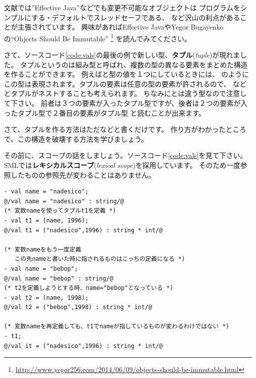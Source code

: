 \documentclass[11pt,a4paper]{article}
\begin{document}
文献では''Effective Java''などでも変更不可能なオブジェクトは
プログラムをシンプルにする・デフォルトでスレッドセーフである、
など沢山の利点があることが主張されています。
興味があればEffective JavaやYegor Bugayenkoの``Objects Should Be Immutable''
\footnote{\url{http://www.yegor256.com/2014/06/09/objects-should-be-immutable.html}}
を読んでみてください。

さて、ソースコード\ref{code:vals}の最後の例で新しい型、{\bfseries タプル}({\itshape tuple})が現れました。
タプルというのは組み型と呼ばれ、複数の型の異なる要素をまとめた構造を作ることができます。
例えばと型の値を１つにしているときには、
のようにこの型は表現されます。タプルの要素は任意の型の要素が許されるので、
などとタプルがネストすることも考えられます。
ちなみにとは違う型なので注意して下さい。
前者は３つの要素が入ったタプル型ですが、後者は２つの要素が入ったタプル型で２番目の要素がタプル型
と読むことが出来ます。

さて、タプルを作る方法はただなどと書くだけです。
作り方がわかったところで、この構造を破壊する方法を学びましょう。

その前に、スコープの話をしましょう。ソースコード\ref{code:vals}を見て下さい。
SMLでは{\bfseries レキシカルスコープ}({\itshape lexical scope})を採用しています。
そのため一度参照したものの参照先が変わることはありません。

\begin{lstlisting}[caption=valのスコープ,label=code:vals]
- val name = "nadesico";
@/val name = "nadesico" : string/@
(* 変数nameを使ってタプルt1を定義 *)
- val t1 = (name, 1996);
@/val t1 = ("nadesico",1996) : string * int/@

(* 変数nameをもう一度定義
   この先nameと書いた時に指されるものはこっちの定義になる *)
- val name = "bebop";
@/val name = "bebop" : string/@
(* t2を定義しようとする時、name="bebop"となっている *)
- val t2 = (name, 1998);
@/val t2 = ("bebop",1998) : string * int/@

(* 変数nameを再定義しても、t1でnameが指しているものが変わるわけではない *)
- t1;
@/val it = ("nadesico",1996) : string * int/@
\end{lstlisting}
\end{document}
